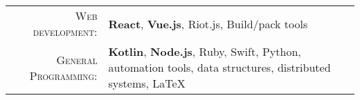%
%
%

\begin{tabular}{rl}
    \textsc{Web development:} & \textbf{React}, \textbf{Vue.js}, Riot.js, Build/pack tools \\ 
    \textsc{General Programming:} & \textbf{Kotlin}, \textbf{Node.js}, Ruby, Swift, Python, automation tools, data structures, distributed systems, LaTeX \\
\end{tabular}
